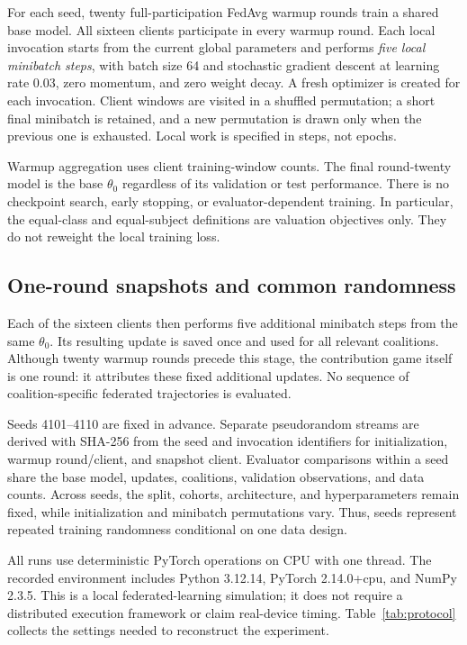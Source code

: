 \documentclass[conference,letterpaper]{IEEEtran}
\begin{document}
For each seed, twenty full-participation FedAvg warmup rounds train a shared base model. All sixteen clients participate in every warmup round. Each local invocation starts from the current global parameters and performs \emph{five local minibatch steps}, with batch size 64 and stochastic gradient descent at learning rate 0.03, zero momentum, and zero weight decay. A fresh optimizer is created for each invocation. Client windows are visited in a shuffled permutation; a short final minibatch is retained, and a new permutation is drawn only when the previous one is exhausted. Local work is specified in steps, not epochs.

Warmup aggregation uses client training-window counts. The final round-twenty model is the base $\theta_0$ regardless of its validation or test performance. There is no checkpoint search, early stopping, or evaluator-dependent training. In particular, the equal-class and equal-subject definitions are valuation objectives only. They do not reweight the local training loss.

\subsection{One-round snapshots and common randomness}
Each of the sixteen clients then performs five additional minibatch steps from the same $\theta_0$. Its resulting update is saved once and used for all relevant coalitions. Although twenty warmup rounds precede this stage, the contribution game itself is one round: it attributes these fixed additional updates. No sequence of coalition-specific federated trajectories is evaluated.

Seeds 4101--4110 are fixed in advance. Separate pseudorandom streams are derived with SHA-256 from the seed and invocation identifiers for initialization, warmup round/client, and snapshot client. Evaluator comparisons within a seed share the base model, updates, coalitions, validation observations, and data counts. Across seeds, the split, cohorts, architecture, and hyperparameters remain fixed, while initialization and minibatch permutations vary. Thus, seeds represent repeated training randomness conditional on one data design.

All runs use deterministic PyTorch operations on CPU with one thread. The recorded environment includes Python 3.12.14, PyTorch 2.14.0+cpu, and NumPy 2.3.5. This is a local federated-learning simulation; it does not require a distributed execution framework or claim real-device timing. Table~\ref{tab:protocol} collects the settings needed to reconstruct the experiment.
\end{document}
